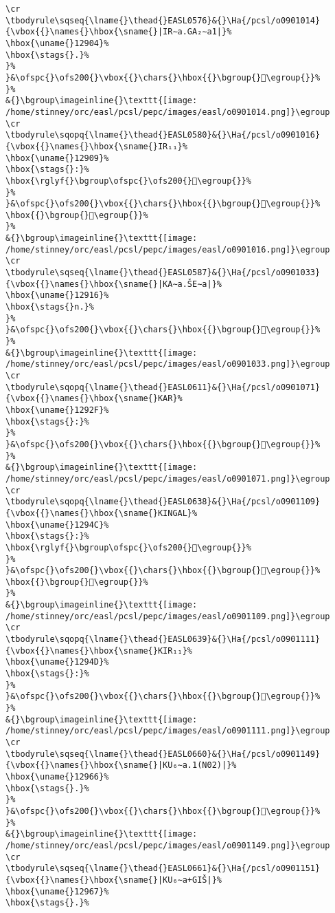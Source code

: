 \begin{verbatim}
\cr
\tbodyrule\sqseq{\lname{}\thead{}EASL0576}&{}\Ha{/pcsl/o0901014}{\vbox{{}\names{}\hbox{\sname{}|IR∼a.GA₂∼a1|}%
\hbox{\uname{}12904}%
\hbox{\stags{}.}%
}%
}&\ofspc{}\ofs200{}\vbox{{}\chars{}\hbox{{}\bgroup{}𒤄\egroup{}}%
}%
&{}\bgroup\imageinline{}\texttt{[image: /home/stinney/orc/easl/pcsl/pepc/images/easl/o0901014.png]}\egroup
\cr
\tbodyrule\sqopq{\lname{}\thead{}EASL0580}&{}\Ha{/pcsl/o0901016}{\vbox{{}\names{}\hbox{\sname{}IR₁₁}%
\hbox{\uname{}12909}%
\hbox{\stags{}:}%
\hbox{\rglyf{}\bgroup\ofspc{}\ofs200{}𒤉\egroup{}}%
}%
}&\ofspc{}\ofs200{}\vbox{{}\chars{}\hbox{{}\bgroup{}𒤈\egroup{}}%
\hbox{{}\bgroup{}𒤉\egroup{}}%
}%
&{}\bgroup\imageinline{}\texttt{[image: /home/stinney/orc/easl/pcsl/pepc/images/easl/o0901016.png]}\egroup
\cr
\tbodyrule\sqseq{\lname{}\thead{}EASL0587}&{}\Ha{/pcsl/o0901033}{\vbox{{}\names{}\hbox{\sname{}|KA∼a.ŠE∼a|}%
\hbox{\uname{}12916}%
\hbox{\stags{}n.}%
}%
}&\ofspc{}\ofs200{}\vbox{{}\chars{}\hbox{{}\bgroup{}𒤖\egroup{}}%
}%
&{}\bgroup\imageinline{}\texttt{[image: /home/stinney/orc/easl/pcsl/pepc/images/easl/o0901033.png]}\egroup
\cr
\tbodyrule\sqopq{\lname{}\thead{}EASL0611}&{}\Ha{/pcsl/o0901071}{\vbox{{}\names{}\hbox{\sname{}KAR}%
\hbox{\uname{}1292F}%
\hbox{\stags{}:}%
}%
}&\ofspc{}\ofs200{}\vbox{{}\chars{}\hbox{{}\bgroup{}𒤯\egroup{}}%
}%
&{}\bgroup\imageinline{}\texttt{[image: /home/stinney/orc/easl/pcsl/pepc/images/easl/o0901071.png]}\egroup
\cr
\tbodyrule\sqopq{\lname{}\thead{}EASL0638}&{}\Ha{/pcsl/o0901109}{\vbox{{}\names{}\hbox{\sname{}KINGAL}%
\hbox{\uname{}1294C}%
\hbox{\stags{}:}%
\hbox{\rglyf{}\bgroup\ofspc{}\ofs200{}𒥌\egroup{}}%
}%
}&\ofspc{}\ofs200{}\vbox{{}\chars{}\hbox{{}\bgroup{}𒥋\egroup{}}%
\hbox{{}\bgroup{}𒥌\egroup{}}%
}%
&{}\bgroup\imageinline{}\texttt{[image: /home/stinney/orc/easl/pcsl/pepc/images/easl/o0901109.png]}\egroup
\cr
\tbodyrule\sqopq{\lname{}\thead{}EASL0639}&{}\Ha{/pcsl/o0901111}{\vbox{{}\names{}\hbox{\sname{}KIR₁₁}%
\hbox{\uname{}1294D}%
\hbox{\stags{}:}%
}%
}&\ofspc{}\ofs200{}\vbox{{}\chars{}\hbox{{}\bgroup{}𒥍\egroup{}}%
}%
&{}\bgroup\imageinline{}\texttt{[image: /home/stinney/orc/easl/pcsl/pepc/images/easl/o0901111.png]}\egroup
\cr
\tbodyrule\sqseq{\lname{}\thead{}EASL0660}&{}\Ha{/pcsl/o0901149}{\vbox{{}\names{}\hbox{\sname{}|KU₆∼a.1(N02)|}%
\hbox{\uname{}12966}%
\hbox{\stags{}.}%
}%
}&\ofspc{}\ofs200{}\vbox{{}\chars{}\hbox{{}\bgroup{}𒥦\egroup{}}%
}%
&{}\bgroup\imageinline{}\texttt{[image: /home/stinney/orc/easl/pcsl/pepc/images/easl/o0901149.png]}\egroup
\cr
\tbodyrule\sqseq{\lname{}\thead{}EASL0661}&{}\Ha{/pcsl/o0901151}{\vbox{{}\names{}\hbox{\sname{}|KU₆∼a+GIŠ|}%
\hbox{\uname{}12967}%
\hbox{\stags{}.}%

\end{verbatim}
